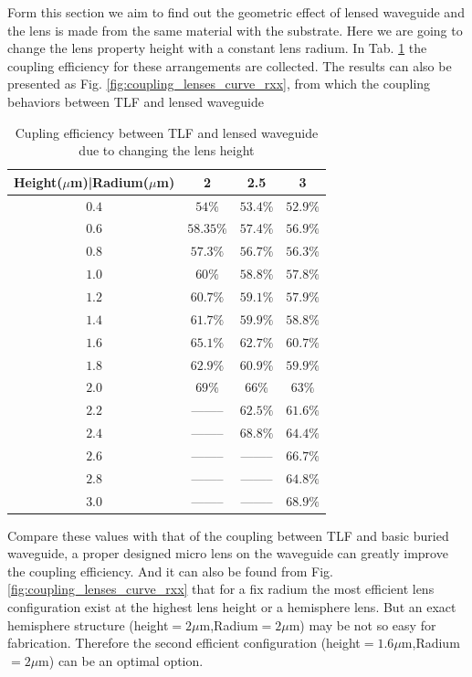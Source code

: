 
Form this section we aim to find out the geometric effect of lensed waveguide and the lens is made from the same material with the substrate. Here we are going to change the lens property height with a constant lens radium. In Tab. \ref{tab:coupling_lensed_waveguide_height} the coupling efficiency for these arrangements are collected. The results can also be presented as Fig. \ref{fig:coupling_lenses_curve_rxx}, from which the coupling behaviors between TLF and lensed waveguide    
\begin{table}
\caption{Cupling efficiency between TLF and lensed waveguide due to changing the lens height}
\centering
\begin{tabular}{|c|c|c|c|}
\hline
Height($\mu$m)|Radium($\mu$m)&	2&	2.5&	3\\
\hline
$0.4$&$54\%$&$53.4\%$&$52.9\%$\\
$0.6$&$58.35\%$&$57.4\%$&$56.9\%$\\
$0.8$&$57.3\%$&$56.7\%$&$56.3\%$\\
$1.0$&$60\%$&$58.8\%$&$57.8\%$\\
$1.2$&$60.7\%$&$59.1\%$&$57.9\%$\\
$1.4$&$61.7\%$&$59.9\%$&$58.8\%$\\
$1.6$&$65.1\%$&$62.7\%$&$60.7\%$\\
$1.8$&$62.9\%$&$60.9\%$&$59.9\%$\\
$2.0$&$69\%$  &  $66\%$&$63\%$\\
$2.2$&--------&$62.5\%$&$61.6\%$\\
$2.4$&--------&$68.8\%$&$64.4\%$\\
$2.6$&--------&--------&$66.7\%$\\
$2.8$&--------&--------&$64.8\%$\\
$3.0$&--------&--------&$68.9\%$\\
\hline

\end{tabular}
\label{tab:coupling_lensed_waveguide_height}
\end{table}
Compare these values with that of the coupling between TLF and basic buried waveguide, a proper designed micro lens on the waveguide can greatly improve the coupling efficiency. And it can also be found from Fig. \ref{fig:coupling_lenses_curve_rxx} that for a fix radium the most efficient lens configuration exist at the highest lens height or a hemisphere lens. But an exact hemisphere structure (height$=2\mu$m,Radium$=2\mu$m) may be not so easy for fabrication. Therefore the second efficient configuration (height$=1.6\mu$m,Radium$=2\mu$m) can be an optimal option. 

